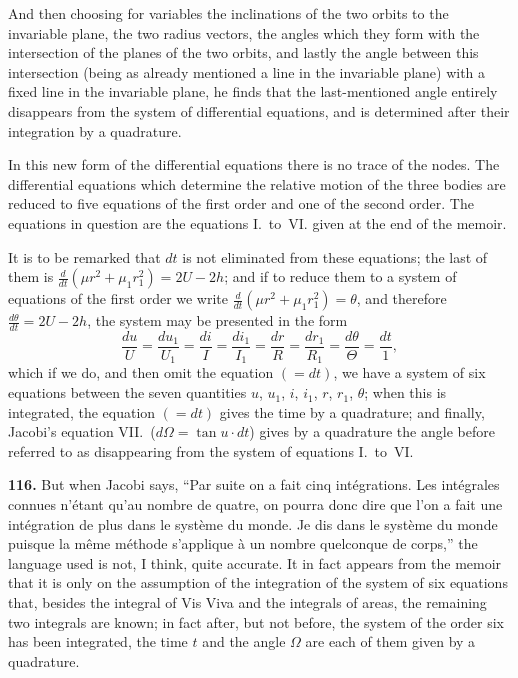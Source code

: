 \documentclass[11pt,a4paper]{article}
\theoremstyle{definition}
\begin{document}
And then choosing for variables the inclinations of the two orbits to the invariable plane, the two radius vectors, the angles which they form with the intersection of the planes of the two orbits, and lastly the angle between this intersection (being as already mentioned a line in the invariable plane) with a fixed line in the invariable plane, he finds that the last-mentioned angle entirely disappears from the system of differential equations, and is determined after their integration by a quadrature.

In this new form of the differential equations there is no trace of the nodes. The differential equations which determine the relative motion of the three bodies are reduced to five equations of the first order and one of the second order. The equations in question are the equations I.~to~VI. given at the end of the memoir.

It is to be remarked that $dt$ is not eliminated from these equations; the last of them is $\frac{d}{dt}(\mu r^2 + \mu_1 r_1^2) = 2U - 2h$; and if to reduce them to a system of equations of the first order we write $\frac{d}{dt}(\mu r^2 + \mu_1 r_1^2) = \theta$, and therefore $\frac{d\theta}{dt} = 2U - 2h$, the system may be presented in the form
\[
\frac{du}{U} = \frac{du_1}{U_1} = \frac{di}{I} = \frac{di_1}{I_1} = \frac{dr}{R} = \frac{dr_1}{R_1} = \frac{d\theta}{\Theta} = \frac{dt}{1},
\]
which if we do, and then omit the equation $(=dt)$, we have a system of six equations between the seven quantities $u$, $u_1$, $i$, $i_1$, $r$, $r_1$, $\theta$; when this is integrated, the equation $(=dt)$ gives the time by a quadrature; and finally, Jacobi's equation VII.\ ($d\Omega = \tan u \cdot dt$) gives by a quadrature the angle before referred to as disappearing from the system of equations I.~to~VI.

\textbf{116.} But when Jacobi says, ``Par suite on a fait cinq int\'egrations. Les int\'egrales connues n'\'etant qu'au nombre de quatre, on pourra donc dire que l'on a fait une int\'egration de plus dans le syst\`eme du monde. Je dis dans le syst\`eme du monde puisque la m\^eme m\'ethode s'applique \`a un nombre quelconque de corps,'' the language used is not, I think, quite accurate. It in fact appears from the memoir that it is only on the assumption of the integration of the system of six equations that, besides the integral of Vis Viva and the integrals of areas, the remaining two integrals are known; in fact after, but not before, the system of the order six has been integrated, the time $t$ and the angle $\Omega$ are each of them given by a quadrature.
\end{document}
